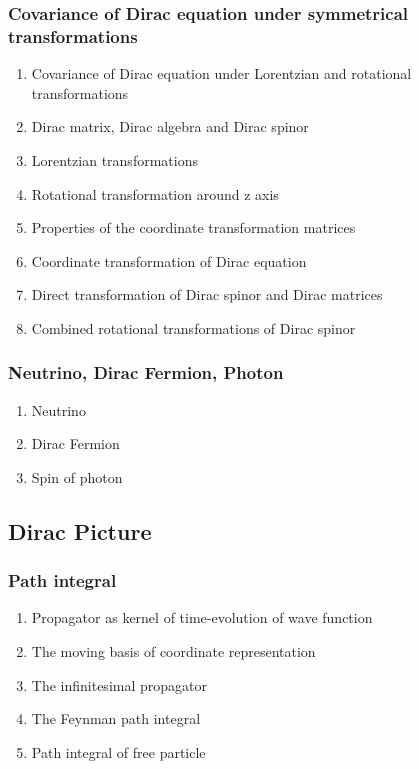 \documentclass[12pt]{article}
\numberwithin{equation}{section}
\begin{document}
\subsubsection{Covariance of Dirac equation under symmetrical transformations}
\begin{enumerate}
\item Covariance of Dirac equation under Lorentzian and rotational transformations
\item Dirac matrix, Dirac algebra and Dirac spinor
\item Lorentzian transformations
\item Rotational transformation around z axis
\item Properties of the coordinate transformation matrices
\item Coordinate transformation of Dirac equation
\item Direct transformation of Dirac spinor and Dirac matrices
\item Combined rotational transformations of Dirac spinor
\end{enumerate}
\subsubsection{Neutrino, Dirac Fermion, Photon}
\begin{enumerate}
\item Neutrino
\item Dirac Fermion
\item Spin of photon
\end{enumerate}
\subsection{Dirac Picture}
\subsubsection{Path integral}
\begin{enumerate}
\item Propagator as kernel of time-evolution of wave function
\item The moving basis of coordinate representation
\item The infinitesimal propagator
\item The Feynman path integral
\item Path integral of free particle
\end{enumerate}
\end{document}
